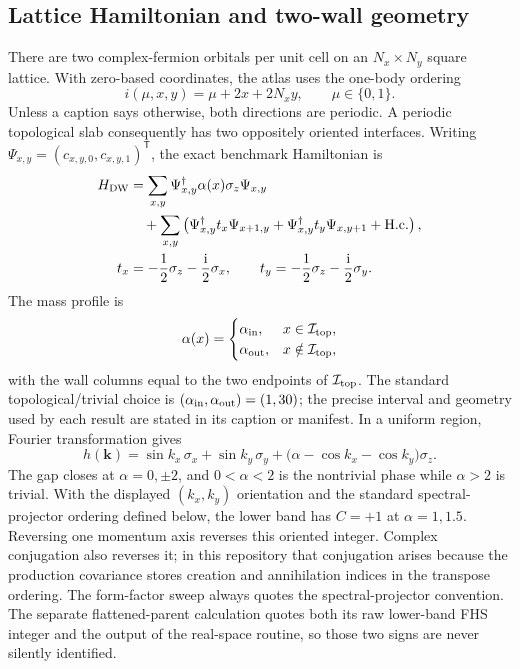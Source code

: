 \documentclass[aps,prb,twocolumn,floatfix,nofootinbib,superscriptaddress]{revtex4-2}
\newcommand{\ii}{\mathrm{i}}
\begin{document}
\subsection{Lattice Hamiltonian and two-wall geometry}
\label{sec:model-hamiltonian}

There are two complex-fermion orbitals per unit cell on an $N_x\times N_y$ square
lattice.  With zero-based coordinates, the atlas uses the one-body ordering
\begin{equation}
 i(\mu,x,y)=\mu+2x+2N_xy,
 \qquad \mu\in\{0,1\}.
 \label{eq:index-convention}
\end{equation}
Unless a caption says otherwise, both directions are periodic.  A periodic topological
slab consequently has two oppositely oriented interfaces.  Writing
$\Psi_{x,y}=(c_{x,y,0},c_{x,y,1})^{\mathsf T}$, the exact benchmark Hamiltonian is
\begin{align}
 H_{\rm DW}
 &=\sum_{x,y}\Psi_{x,y}^{\dagger}\alpha(x)\sigma_z\Psi_{x,y}
 \nonumber\\
 &\quad+\sum_{x,y}\left(
 \Psi_{x,y}^{\dagger}t_x\Psi_{x+1,y}
 +\Psi_{x,y}^{\dagger}t_y\Psi_{x,y+1}
 +\mathrm{H.c.}\right),
 \label{eq:real-space-hamiltonian}\\
 t_x&=-\frac12\sigma_z-\frac{\ii}{2}\sigma_x,
 \qquad
 t_y=-\frac12\sigma_z-\frac{\ii}{2}\sigma_y .
 \label{eq:hopping-matrices}
\end{align}
The mass profile is
\begin{equation}
 \alpha(x)=
 \begin{cases}
 \alpha_{\rm in},&x\in\mathcal I_{\rm top},\\
 \alpha_{\rm out},&x\notin\mathcal I_{\rm top},
 \end{cases}
 \label{eq:mass-profile}
\end{equation}
with the wall columns equal to the two endpoints of $\mathcal I_{\rm top}$.  The standard
topological/trivial choice is $(\alpha_{\rm in},\alpha_{\rm out})=(1,30)$; the precise
interval and geometry used by each result are stated in its caption or manifest.  In a
uniform region, Fourier transformation gives
\begin{equation}
 h(\boldsymbol{k})=\sin k_x\,\sigma_x+\sin k_y\,\sigma_y
 +\bigl(\alpha-\cos k_x-\cos k_y\bigr)\sigma_z .
 \label{eq:bloch-hamiltonian}
\end{equation}
The gap closes at $\alpha=0,\pm2$, and $0<\alpha<2$ is the nontrivial phase while
$\alpha>2$ is trivial.  With the displayed $(k_x,k_y)$ orientation and the standard
spectral-projector ordering defined below, the lower band has $C=+1$ at
$\alpha=1,1.5$.  Reversing one momentum axis reverses this oriented integer.  Complex
conjugation also reverses it; in this repository that conjugation arises because the
production covariance stores creation and annihilation indices in the transpose ordering.
The form-factor sweep always quotes the spectral-projector convention.  The separate
flattened-parent calculation quotes both its raw lower-band FHS integer and the output of
the real-space routine, so those two signs are never silently identified.
\end{document}
